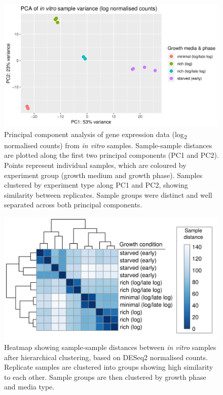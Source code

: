 \hfill
\begin{figure}[H]
  \includegraphics[scale=0.85]{psa/PCA_final_samples.png}
  \centering
  \caption[PCA plot of \textit{in vitro} samples]{Principal component analysis of gene expression data (log\textsubscript{2} normalised counts) from \textit{in vitro} samples. Sample-sample distances are plotted along the first two principal components (PC1 and PC2). Points represent individual samples, which are coloured by experiment group (growth medium and growth phase). Samples clustered by experiment type along PC1 and PC2, showing similarity between replicates. Sample groups were distinct and well separated across both principal components.}
  \label{fig:PCA_plot}
\end{figure}


\begin{figure}[H]
  \centering
    \includegraphics[width=\textwidth]{psa/sample_distances_combo_final.png}
  \caption[Hierarchical clustering of \textit{in vitro} RNA-seq samples]{Heatmap showing sample-sample distances between \textit{in vitro} samples after hierarchical clustering, based on DESeq2 normalised counts. Replicate samples are clustered into groups showing high similarity to each other. Sample groups are then clustered by growth phase and media type.}
  \label{fig:hierarchical_clustering}
\end{figure}

